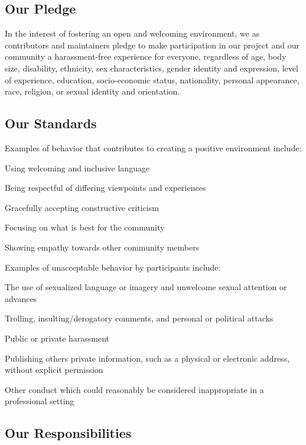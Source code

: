 \subsection*{Our Pledge}

In the interest of fostering an open and welcoming environment, we as contributors and maintainers pledge to make participation in our project and our community a harassment-\/free experience for everyone, regardless of age, body size, disability, ethnicity, sex characteristics, gender identity and expression, level of experience, education, socio-\/economic status, nationality, personal appearance, race, religion, or sexual identity and orientation.

\subsection*{Our Standards}

Examples of behavior that contributes to creating a positive environment include\+:


\begin{DoxyItemize}
\item Using welcoming and inclusive language
\item Being respectful of differing viewpoints and experiences
\item Gracefully accepting constructive criticism
\item Focusing on what is best for the community
\item Showing empathy towards other community members
\end{DoxyItemize}

Examples of unacceptable behavior by participants include\+:


\begin{DoxyItemize}
\item The use of sexualized language or imagery and unwelcome sexual attention or advances
\item Trolling, insulting/derogatory comments, and personal or political attacks
\item Public or private harassment
\item Publishing others\textquotesingle{} private information, such as a physical or electronic address, without explicit permission
\item Other conduct which could reasonably be considered inappropriate in a professional setting
\end{DoxyItemize}

\subsection*{Our Responsibilities}

